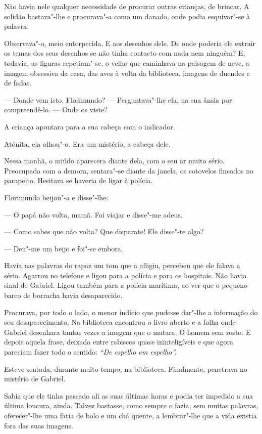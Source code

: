 Não havia nele qualquer necessidade de procurar outras crianças, de
brincar. A solidão bastava"-lhe e procurava"-a como um danado, onde podia
esquivar"-se à palavra.

Observava"-o, meio entorpecida. E aos desenhos dele. De onde poderia ele
extrair os temas dos seus desenhos se não tinha contacto com nada nem
ninguém? E, todavia, as figuras repetiam"-se, o velho que caminhava na
paisagem de neve, a imagem obsessiva da casa, das aves à volta da
biblioteca, imagens de duendes e de fadas.

--- Donde vem isto, Florimundo? --- Perguntava"-lhe ela, na sua ânsia por
compreendê-lo. ---  Onde os viste?

A criança apontara para a sua cabeça com o indicador.

Atónita, ela olhou"-o. Era um mistério, a cabeça dele.

Nessa manhã, o miúdo aparecera diante dela, com o seu ar muito sério.
Preocupada com a demora, sentara"-se diante da janela, os cotovelos
fincados no parapeito. Hesitava se haveria de ligar à polícia.

Florimundo beijou"-a e disse"-lhe:

--- O papá não volta, mamã. Foi viajar e disse"-me adeus.

--- Como sabes que não volta? Que disparate! Ele disse"-te algo?

--- Deu"-me um beijo e foi"-se embora.

Havia nas palavras do rapaz um tom que a afligiu, percebeu que ele
falava a sério. Agarrou no telefone e ligou para a polícia e para os
hospitais. Não havia sinal de Gabriel. Ligou também para a polícia
marítima, ao ver que o pequeno barco de borracha havia desaparecido.

Procurava, por todo o lado, o menor indício que pudesse dar"-lhe a
informação do seu desaparecimento. Na biblioteca encontrou o livro
aberto e a folha onde Gabriel desenhara tantas vezes a imagem que o
matara. O homem sem rosto. E depois aquela frase, deixada entre rabiscos
quase ininteligíveis e que agora pareciam fazer todo o sentido:
\emph{``De espelho em espelho''.}

Esteve sentada, durante muito tempo, na biblioteca. Finalmente,
penetrava no mistério de Gabriel.

Sabia que ele tinha passado ali as suas últimas horas e podia ter
impedido a sua última loucura, ainda. Talvez bastasse, como sempre o
fazia, sem muitas palavras, oferecer"-lhe uma fatia de bolo e um chá
quente, a lembrar"-lhe que a vida existia fora das suas imagens.

